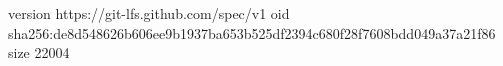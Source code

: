 version https://git-lfs.github.com/spec/v1
oid sha256:de8d548626b606ee9b1937ba653b525df2394c680f28f7608bdd049a37a21f86
size 22004

